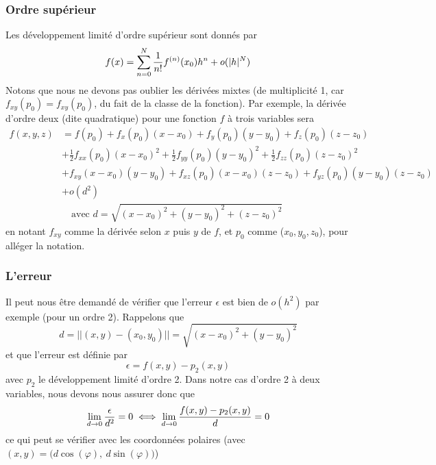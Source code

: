 \documentclass[12pt,a4paper]{article}
\renewcommand{\)}{\right)}
\renewcommand{\(}{\left(}
\begin{document}
\subsubsection{Ordre supérieur}
Les développement limité d'ordre supérieur sont donnés par 
\[f(x) = \somme{N}{n=0}{\frac{1}{n!}f^{(n)}(x_0)h^n + o(|h|^N)}\]
Notons que nous ne devons pas oublier les dérivées mixtes (de multiplicité 1, car $f_{xy}(p_0) = f_{xy}(p_0)$, du fait de la classe de la fonction). Par exemple, la dérivée d'ordre deux (dite quadratique) pour une fonction $f$ à trois variables sera 
\[\begin{array}{ll}
	f(x,y,z) 	&= f(p_0) + f_x(p_0)(x-x_0) + f_y(p_0)(y-y_0) + f_z(p_0)(z-z_0)\\
				&+ \frac{1}{2}f_{xx}(p_0)(x-x_0)^2 + \frac{1}{2}f_{yy}(p_0)(y-y_0)^2 + \frac{1}{2}f_{zz}(p_0)(z-z_0)^2\\
				&+ f_{xy}(x-x_0)(y-y_0) + f_{xz}(p_0)(x-x_0)(z-z_0) + f_{yz}(p_0)(y-y_0)(z-z_0)\\
				&+o(d^2)\\
				& \quad \text{avec } d = \sqrt{(x-x_0)^2 + (y-y_0)^2 + (z-z_0)^2}
\end{array}\]
en notant $f_{xy}$ comme la dérivée selon $x$ puis $y$ de $f$, et $p_0$ comme ($x_0,y_0,z_0$), pour alléger la notation.
\subsubsection{L'erreur}
Il peut nous être demandé de vérifier que l'erreur $\epsilon$ est bien de $o(h^2)$ par exemple (pour un ordre 2). Rappelons que \[d = ||(x,y)-(x_0,y_0)|| = \sqrt{(x-x_0)^2 + (y-y_0)^2}\] et que l'erreur est définie par \[\epsilon = f(x,y) - p_2(x,y)\]
avec $p_2$ le développement limité d'ordre 2. Dans notre cas d'ordre 2 à deux variables, nous devons nous assurer donc que 
\[\limite{d\to 0} \frac{\epsilon}{d^2} = 0 \iff \limite{d\to 0} \frac{f(x,y)-p_2(x,y)}{d} = 0\] ce qui peut se vérifier avec les coordonnées polaires \Big(avec $(x,y) = \big(d\cos(\varphi),\ d\sin(\varphi)\big)$\Big)
\end{document}
